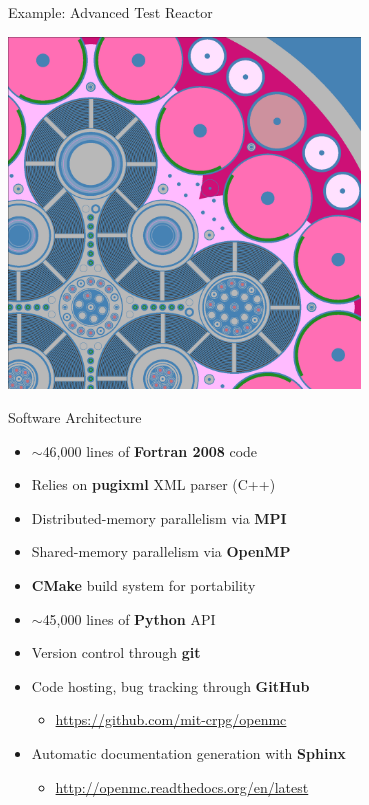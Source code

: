 \documentclass[noamssymb,svgnames]{beamer}
\begin{document}
\begin{frame}{Example: Advanced Test Reactor}
  \begin{center}
    \includegraphics[width=0.7\textwidth]{../images/atr.png}
  \end{center}
\end{frame}

\begin{frame}{Software Architecture}
  \begin{itemize}
  \item $\sim$46,000 lines of \textbf{Fortran 2008} code
  \item Relies on \textbf{pugixml} XML parser (C++)
  \item Distributed-memory parallelism via \textbf{MPI}
  \item Shared-memory parallelism via \textbf{OpenMP}
  \item \textbf{CMake} build system for portability
  \item $\sim$45,000 lines of \textbf{Python} API
  \item Version control through \textbf{git}
  \item Code hosting, bug tracking through \textbf{GitHub}
    \begin{itemize}
    \item \url{https://github.com/mit-crpg/openmc}
    \end{itemize}
  \item Automatic documentation generation with \textbf{Sphinx}
    \begin{itemize}
    \item \url{http://openmc.readthedocs.org/en/latest}
    \end{itemize}
  \end{itemize}
\end{frame}
\end{document}
